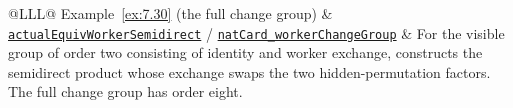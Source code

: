 \begin{xltabular}{\linewidth}{@{}LLL@{}}
\addlinespace[3pt]
Example~\ref{ex:7.30} (the full change group) & \href{https://github.com/iroha1203/AlgebraicArchitectureTheoryV2/blob/7e68ec6e77ef0249ede6a4c875715cfaf1cb3ee6/research/lean/ResearchLean/AG/RealizationReconstruction/FixedFSemidirectProduct.lean\#L672}{\texttt{actual\allowbreak{}Equiv\allowbreak{}Worker\allowbreak{}Semidirect}} / \href{https://github.com/iroha1203/AlgebraicArchitectureTheoryV2/blob/7e68ec6e77ef0249ede6a4c875715cfaf1cb3ee6/research/lean/ResearchLean/AG/RealizationReconstruction/FixedFSemidirectProduct.lean\#L679}{\texttt{nat\allowbreak{}Card\_\allowbreak{}worker\allowbreak{}Change\allowbreak{}Group}} & For the visible group of order two consisting of identity and worker exchange, constructs the semidirect product whose exchange swaps the two hidden-permutation factors. The full change group has order eight. \\
\addlinespace[3pt]

\end{xltabular}
